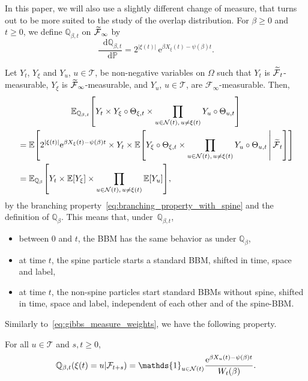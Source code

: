 \documentclass[AHL,Unicode,longabstracts,published]{cedram}
\newcommand{\e}{\mathrm{e}}
\renewcommand{\d}[1]{\mathop{}\!\mathrm{d}#1}
\newcommand{\E}{\mathbb{E}}
\renewcommand{\P}{\mathbb{P}}
\newcommand{\Q}{\mathbb{Q}}
\newcommand\1{\mathds{1}}
\newcommand{\cF}{\mathcal{F}}
\newcommand{\cN}{\mathcal{N}}
\newcommand{\cT}{\mathcal{T}}
\let\oldtilde\tilde
\renewcommand*{\tilde}[1]{\mathchoice{\widetilde{#1}}{\widetilde{#1}}{\oldtilde{#1}}{\oldtilde{#1}}}
\let\originalleft\left
\let\originalright\right
\renewcommand{\left}{\mathopen{}\mathclose\bgroup\originalleft}
\renewcommand{\right}{\aftergroup\egroup\originalright}
\begin{document}
In this paper, we will also use a slightly different change of measure, that turns out to be more suited to the study of the overlap distribution. For $\beta \geq 0$ and $t \geq 0$, we define $\Q_{\beta, t}$ on $\tilde{\cF}_\infty$ by
\begin{equation}\label{eq:definition_of_Q_bt}
\frac{\d{\Q_{\beta, t}}}{\d{\P}} = 2^{|\xi(t)|}\, \e^{\beta X_\xi(t) - \psi(\beta) t}.
\end{equation}

\begin{rema}
Let $Y_t$, $Y_\xi$ and $Y_u$, $u \in \cT$, be non-negative variables on $\Omega$ such that $Y_t$ is $\tilde{\cF}_t$-measurable, $Y_\xi$ is $\tilde{\cF}_\infty$-measurable, and $Y_u$, $u \in \cT$, are $\cF_\infty$-measurable. Then,
\begin{multline}
\E_{\Q_{\beta, t}} \left[Y_t \times Y_\xi \circ \Theta_{\xi, t} \times \prod_{u \in \cN(t),\, u \neq \xi(t)} Y_u \circ \Theta_{u, t} \right]\\
\begin{aligned}
& = \E \left[2^{|\xi(t)|} \e^{\beta X_\xi(t) - \psi(\beta)t} \times Y_t \times \E \left[Y_\xi \circ \Theta_{\xi, t} \times \prod_{u \in \cN(t),\, u \neq \xi(t)} Y_u \circ \Theta_{u, t} \,\middle|\, \tilde{\cF}_t \right] \right]\\
& = \E_{\Q_\beta} \left[Y_t \times \E \left[Y_{\xi} \right] \times \prod_{u \in \cN(t),\, u \neq \xi(t)} \E \left[Y_u \right] \right],
\end{aligned}
\end{multline}
by the branching property~\eqref{eq:branching_property_with_spine} and the definition of $\Q_\beta$. This means that, under~$\Q_{\beta, t}$,
\begin{itemize}
\item between $0$ and $t$, the BBM has the same behavior as under $\Q_\beta$,
\item at time $t$, the spine particle starts a standard BBM, shifted in time, space and label,
\item at time $t$, the non-spine particles start standard BBMs without spine, shifted in time, space and label, independent of each other and of the spine-BBM.
\end{itemize}
\end{rema}

Similarly to~\eqref{eq:gibbs_measure_weights}, we have the following property.

\begin{lemm}\label{lem:gibbs_measure_weights}
For all $u \in \cT$ and $s, t \geq 0$,
\begin{equation*}
\Q_{\beta, t}\left(\xi(t) = u \middle| \cF_{t + s}\right) = \1_{u \in \cN(t)} \frac{\e^{\beta X_u(t) - \psi(\beta)t}}{W_t(\beta)}.
\end{equation*}
\end{lemm}
\end{document}
